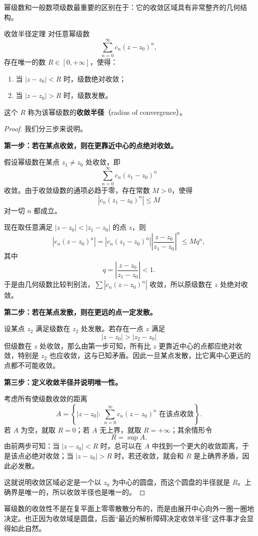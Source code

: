 幂级数和一般数项级数最重要的区别在于：它的收敛区域具有非常整齐的几何结构。

\begin{dingli}{收敛半径定理}{}
对任意幂级数
\[
    \sum_{n=0}^{\infty} c_n (z-z_0)^n,
\]
存在唯一的数 $R \in [0,+\infty]$，使得：
\begin{enumerate}
    \item 当 $|z-z_0| < R$ 时，级数绝对收敛；
    \item 当 $|z-z_0| > R$ 时，级数发散。
\end{enumerate}
这个 $R$ 称为该幂级数的\textbf{收敛半径}（radius of convergence）。
\end{dingli}


\begin{proof}
我们分三步来说明。

\textbf{第一步：若在某点收敛，则在更靠近中心的点绝对收敛。}

假设幂级数在某点 $z_1 \ne z_0$ 处收敛，即
\[
    \sum_{n=0}^{\infty} c_n (z_1-z_0)^n
\]
收敛。由于收敛级数的通项必趋于零，存在常数 $M>0$，使得
\[
    |c_n (z_1-z_0)^n| \le M
\]
对一切 $n$ 都成立。

现在取任意满足 $|z-z_0| < |z_1-z_0|$ 的点 $z$，则
\[
    |c_n(z-z_0)^n|
    = |c_n(z_1-z_0)^n| \left|\frac{z-z_0}{z_1-z_0}\right|^n
    \le M q^n,
\]
其中
\[
    q=\left|\frac{z-z_0}{z_1-z_0}\right|<1.
\]
于是由几何级数比较判别法，$\sum |c_n(z-z_0)^n|$ 收敛，所以原级数在 $z$ 处绝对收敛。

\textbf{第二步：若在某点发散，则在更远的点一定发散。}

设某点 $z_2$ 满足级数在 $z_2$ 处发散。若存在一点 $z$ 满足
\[
    |z-z_0|>|z_2-z_0|
\]
但级数在 $z$ 处收敛，那么由第一步可知，所有比 $z$ 更靠近中心的点都应绝对收敛，特别是 $z_2$ 也应收敛，这与已知矛盾。因此一旦某点发散，比它离中心更远的点都不可能收敛。

\textbf{第三步：定义收敛半径并说明唯一性。}

考虑所有使级数收敛的距离
\[
    A=\left\{|z-z_0|:\ \sum_{n=0}^{\infty}c_n(z-z_0)^n \text{ 在该点收敛}\right\}.
\]
若 $A$ 为空，就取 $R=0$；若 $A$ 无上界，就取 $R=+\infty$；其余情形令
\[
    R=\sup A.
\]
由前两步可知：当 $|z-z_0|<R$ 时，总可以在 $A$ 中找到一个更大的收敛距离，于是该点必绝对收敛；当 $|z-z_0|>R$ 时，若还收敛，就会和 $R$ 是上确界矛盾，因此必发散。

这就说明收敛区域必定是一个以 $z_0$ 为中心的圆盘，而这个圆盘的半径就是 $R$。上确界是唯一的，所以收敛半径也是唯一的。
\end{proof}

\begin{zhu}{}{}
幂级数的收敛性不是在复平面上零零散散分布的，而是由展开中心向外一圈一圈地决定。也正因为收敛域是圆盘，后面``最近的解析障碍决定收敛半径''这件事才会显得如此自然。
\end{zhu}

